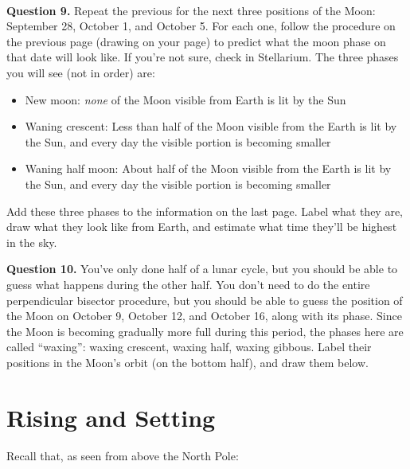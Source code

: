 \documentclass[11pt]{article}
\begin{document}
\vspace*{1.5cm}

\hrulefill\\
\newpage

\textbf{Question 9.} Repeat the previous for the next three positions of the Moon: September 28, October 1, and October 5. 
For each one, follow the procedure on the previous page (drawing on your page) to predict what the moon phase on that date will look like.
If you're not sure, check in Stellarium. The three phases you will see (not in order) are:

\begin{itemize}
	\item New moon: {\it none} of the Moon visible from Earth is lit by the Sun
	\item Waning crescent: Less than half of the Moon visible from the Earth is lit by the Sun, and every day the visible portion is becoming smaller
	\item Waning half moon: About half of the Moon visible from the Earth is lit by the Sun, and every day the visible portion is becoming smaller
\end{itemize}

Add these three phases to the information on the last page. Label what they are, draw what they look like from Earth, and 
estimate what time they'll be highest in the sky.

\vspace{1in}

\textbf{Question 10.} You've only done half of a lunar cycle, but you should be able to guess what happens during the other half.
You don't need to do the entire perpendicular bisector procedure, but you should be able to guess the position of the Moon on 
October 9, October 12, and October 16, along with its phase. Since the Moon is becoming gradually more full during this period, 
the phases here are called ``waxing'': waxing crescent, waxing half, waxing gibbous. Label their positions in the Moon's orbit (on the bottom half), and draw them below.

\newpage

\section{Rising and Setting}

Recall that, as seen from above the North Pole:
\end{document}

